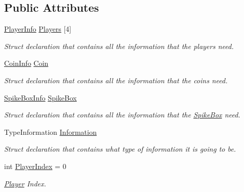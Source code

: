 \subsection*{Public Attributes}
\begin{DoxyCompactItemize}
\item 
\mbox{\label{class_net_work_manager_ad7107f1381e38cdddca15fc9bd34c7d0}} 
\hyperlink{struct_player_info}{Player\+Info} \hyperlink{class_net_work_manager_ad7107f1381e38cdddca15fc9bd34c7d0}{Players} \mbox{[}4\mbox{]}
\begin{DoxyCompactList}\small\item\em Struct declaration that contains all the information that the players need. \end{DoxyCompactList}\item 
\mbox{\label{class_net_work_manager_ae7f40c6dc097fbffaaa529ecd634c15b}} 
\hyperlink{struct_coin_info}{Coin\+Info} \hyperlink{class_net_work_manager_ae7f40c6dc097fbffaaa529ecd634c15b}{Coin}
\begin{DoxyCompactList}\small\item\em Struct declaration that contains all the information that the coins need. \end{DoxyCompactList}\item 
\mbox{\label{class_net_work_manager_a1a061b856e3ff9873809adb8689f716d}} 
\hyperlink{struct_spike_box_info}{Spike\+Box\+Info} \hyperlink{class_net_work_manager_a1a061b856e3ff9873809adb8689f716d}{Spike\+Box}
\begin{DoxyCompactList}\small\item\em Struct declaration that contains all the information that the \hyperlink{class_spike_box}{Spike\+Box} need. \end{DoxyCompactList}\item 
\mbox{\label{class_net_work_manager_a0bead5f17fd244e7a97c49f1cd081ba5}} 
Type\+Information \hyperlink{class_net_work_manager_a0bead5f17fd244e7a97c49f1cd081ba5}{Information}
\begin{DoxyCompactList}\small\item\em Struct declaration that contains what type of information it is going to be. \end{DoxyCompactList}\item 
\mbox{\label{class_net_work_manager_aca3e5694b6645ef38d28b00a66e226a3}} 
int \hyperlink{class_net_work_manager_aca3e5694b6645ef38d28b00a66e226a3}{Player\+Index} = 0
\begin{DoxyCompactList}\small\item\em \hyperlink{class_player}{Player} Index. \end{DoxyCompactList}\end{DoxyCompactItemize}
